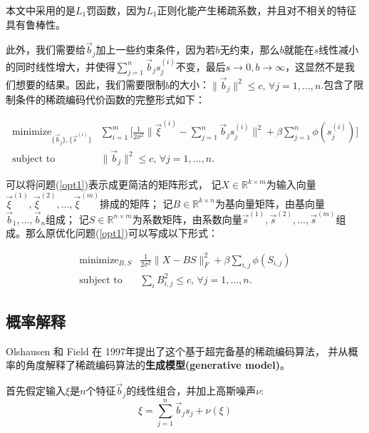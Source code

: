 本文中采用的是$L_1$罚函数，因为$L_1$正则化能产生稀疏系数，并且对不相关的特征具有鲁棒性。

此外，我们需要给$\vec{b}_j$加上一些约束条件，因为若$b$无约束，那么$b$就能在$s$线性减小的同时线性增大，并使得$\sum_{j=1}^n \vec{b}_j s_j^{(i)}$不变，最后$s\rightarrow0,b\rightarrow\infty$，这显然不是我们想要的结果。因此，我们需要限制$b$的大小：$\|\vec{b}_j\|^2 \leq c, \,\forall j = 1,...,n$.包含了限制条件的稀疏编码代价函数的完整形式如下：

\begin{equation}\label{opt1}
\begin{array}{rc}
\text{minimize}_{\{\vec{b}_j\},\{\vec{s}^{(i)}\}} & \sum_{i=1}^{m} \Big[\frac{1}{2\sigma^2}\| \vec{\xi}^{(i)} - \sum_{j=1}^n \vec{b}_j s_j^{(i)}\|^2+ \beta \sum_{j=1}^{n}\phi(s_j^{(i)})\Big]\\
\text{subject to}  &  \|\vec{b}_j\|^2 \leq c, \,\forall j = 1,...,n.
\end{array}
\end{equation}

可以将问题(\ref{opt1})表示成更简洁的矩阵形式，
记$X\in \mathbb{R}^{k\times m}$为输入向量$\vec{\xi}^ {(1)},\vec{\xi}^ {(2)},\ldots,\vec{\xi}^{(m)}$排成的矩阵；
记$B\in \mathbb{R}^{k\times n}$为基向量矩阵，由基向量$ \vec{b}_1,\ldots,\vec{b}_n$组成；
记$S\in \mathbb{R}^{n\times m}$为系数矩阵，由系数向量$\vec{s}^ {(1)},\vec{s} ^{(2)},\ldots,\vec{s}^{(m)}$组成。那么原优化问题(\ref{opt1})可以写成以下形式：

\begin{equation}\label{opt2}
\begin{array}{rc}
\text{minimize}_{B,S} & \frac{1}{2\sigma^2}\|X-BS\|_F^2
+ \beta \sum_{i,j}\phi(S_{i,j})\\
\text{subject to}  &  \sum_{i}B_{i,j}^2 \leq c, \,\forall j = 1,\ldots,n.
\end{array}
\end{equation}


\subsection{概率解释}
Olshausen 和 Field 在 1997年提出了这个基于超完备基的稀疏编码算法，
并从概率的角度解释了稀疏编码算法的\textbf{生成模型(generative model)}。

首先假定输入$\xi$是$n$个特征$\vec{b}_j$的线性组合，并加上高斯噪声$\nu$:
\begin{equation}
  \xi = \sum_{j=1}^n \vec{b}_j s_j+\nu(\xi)
\end{equation}

